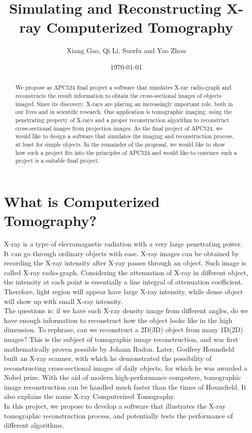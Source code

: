 \documentclass[11]{article}
\title{Simulating and Reconstructing X-ray Computerized Tomography}
\author{Xiang Gao, Qi Li, Suerfu and Yao Zhou}
\date{\today}
\begin{document}
	\maketitle
	
\begin{abstract}
	We propose as APC524 final project a software that simulates X-ray radio-graph and reconstructs the result information to obtain the cross-sectional images of objects imaged. Since its discovery, X-rays are playing an increasingly important role, both in our lives and in scientific research. One application is tomographic imaging: using the penetrating property of X-rays and a proper reconstruction algorithm to reconstruct cross-sectional images from projection images. As the final project of APC524, we would like to design a software that simulates the imaging and reconstruction process, at least for simple objects. In the remainder of the proposal, we would like to show how such a project fits into the principles of APC524 and would like to convince such a project is a suitable final project.
\end{abstract}

\section{What is Computerized Tomography?}
	X-ray is a type of elecromagnetic radiation with a very large penetrating power. It can go through ordinary objects with ease. X-ray images can be obtained by recording the X-ray intensity after X-ray passes through an object. Such image is called X-ray radio-graph. Considering the attenuation of X-ray in different object, the intensity at each point is essentially a line integral of attenuation coefficient. Therefore, light region will appear have large X-ray intensity, while dense object will show up with small X-ray intensity.\\
	The questions is: if we have such X-ray density image from different angles, do we have enough information to reconstruct how the object looks like in the high dimension. To rephrase, can we reconstruct a 2D(3D) object from many 1D(2D) images? This is the subject of tomographic image reconstruction, and was first mathematically proven possible by Johann Radon. Later, Godfrey Hounsfield built an X-ray scanner, with which he demonstrated the possibility of reconstructing cross-sectional images of daily objects, for which he was awarded a Nobel prize. With the aid of modern high-performance computers, tomographic image reconstruction can be handled much faster than the times of Hounsfield. It also explains the name X-ray Computerized Tomography.
\\
	In this project, we propose to develop a software that illustrates the X-ray tomographic reconstruction process, and potentially tests the performance of different algorithms.  
\end{document}
